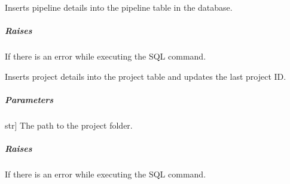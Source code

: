 \documentclass[letterpaper,10pt,english]{sphinxmanual}
\begin{document}
\begin{fulllineitems}
\begin{fulllineitems}
\label{\detokenize{main.db_operations:main.db_operations.db_insertion_handler.DBInsertionHandler.insert_into_pipeline_table}}
\pysigstartsignatures
{}
\pysigstopsignatures
\sphinxAtStartPar
Inserts pipeline details into the pipeline table in the database.


\subparagraph{Raises}
\label{\detokenize{main.db_operations:id3}}\begin{description}
\sphinxAtStartPar
If there is an error while executing the SQL command.

\end{description}

\end{fulllineitems}


\begin{fulllineitems}
\label{\detokenize{main.db_operations:main.db_operations.db_insertion_handler.DBInsertionHandler.insert_into_project_table}}
\pysigstartsignatures
{}
\pysigstopsignatures
\sphinxAtStartPar
Inserts project details into the project table and updates the last project ID.


\subparagraph{Parameters}
\label{\detokenize{main.db_operations:id4}}\begin{description}
\sphinxlineitem{project\_folder\_path}{[}str{]}
\sphinxAtStartPar
The path to the project folder.

\end{description}


\subparagraph{Raises}
\label{\detokenize{main.db_operations:id5}}\begin{description}
\sphinxAtStartPar
If there is an error while executing the SQL command.

\end{description}

\end{fulllineitems}



\end{fulllineitems}
\end{document}
